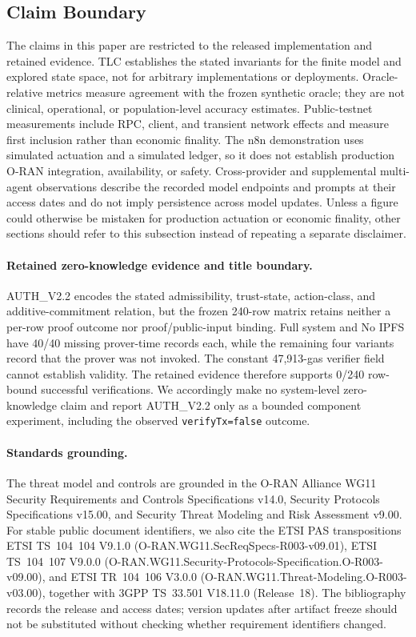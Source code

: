\subsection{Claim Boundary}
The claims in this paper are restricted to the released implementation and
retained evidence. TLC establishes the stated invariants for the finite model
and explored state space, not for arbitrary implementations or deployments.
Oracle-relative metrics measure agreement with the frozen synthetic oracle;
they are not clinical, operational, or population-level accuracy estimates.
Public-testnet measurements include RPC, client, and transient network effects
and measure first inclusion rather than economic finality. The n8n demonstration
uses simulated actuation and a simulated ledger, so it does not establish
production O-RAN integration, availability, or safety. Cross-provider and
supplemental multi-agent observations describe the recorded model endpoints and
prompts at their access dates and do not imply persistence across model updates.
Unless a figure could otherwise be mistaken for production actuation or
economic finality, other sections should refer to this subsection instead of
repeating a separate disclaimer.

\paragraph{Retained zero-knowledge evidence and title boundary.}
AUTH\_V2.2 encodes the stated admissibility, trust-state, action-class, and
additive-commitment relation, but the frozen 240-row matrix retains neither a
per-row proof outcome nor proof/public-input binding. Full system and No IPFS
have 40/40 missing prover-time records each, while the remaining four variants
record that the prover was not invoked. The constant 47,913-gas verifier field
cannot establish validity. The retained evidence therefore supports 0/240
row-bound successful verifications. We accordingly make no system-level
zero-knowledge claim and report AUTH\_V2.2 only as a bounded component
experiment, including the observed \texttt{verifyTx=false} outcome.

\paragraph{Standards grounding.}
The threat model and controls are grounded in the O-RAN Alliance WG11 Security
Requirements and Controls Specifications v14.0, Security Protocols
Specifications v15.00, and Security Threat Modeling and Risk Assessment v9.00.
For stable public document identifiers, we also cite the ETSI PAS
transpositions ETSI TS~104~104 V9.1.0
(O-RAN.WG11.SecReqSpecs-R003-v09.01), ETSI TS~104~107 V9.0.0
(O-RAN.WG11.Security-Protocols-Specification.O-R003-v09.00), and ETSI
TR~104~106 V3.0.0 (O-RAN.WG11.Threat-Modeling.O-R003-v03.00), together with
3GPP TS~33.501 V18.11.0 (Release~18). The bibliography records the release and
access dates; version updates after artifact freeze should not be substituted
without checking whether requirement identifiers changed.

